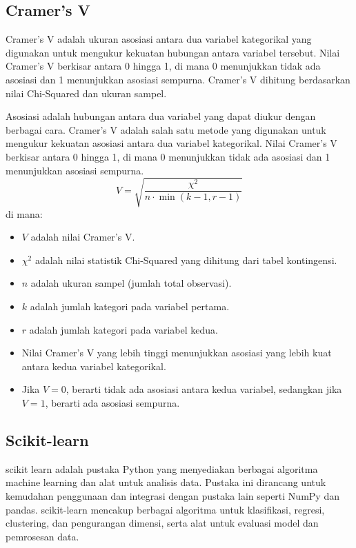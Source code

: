 \subsection{Cramer's V}
Cramer's V adalah ukuran asosiasi antara dua variabel kategorikal yang digunakan untuk mengukur kekuatan hubungan antara variabel tersebut. Nilai Cramer's V berkisar antara 0 hingga 1, di mana 0 menunjukkan tidak ada asosiasi dan 1 menunjukkan asosiasi sempurna. Cramer's V dihitung berdasarkan nilai Chi-Squared dan ukuran sampel.

Asosiasi adalah hubungan antara dua variabel yang dapat diukur dengan berbagai cara. Cramer's V adalah salah satu metode yang digunakan untuk mengukur kekuatan asosiasi antara dua variabel kategorikal. Nilai Cramer's V berkisar antara 0 hingga 1, di mana 0 menunjukkan tidak ada asosiasi dan 1 menunjukkan asosiasi sempurna.
\begin{equation}
    V = \sqrt{\frac{\chi^2}{n \cdot \min(k-1, r-1)}}
\end{equation}
di mana:
\begin{itemize}
    \item \( V \) adalah nilai Cramer's V.
    \item \( \chi^2 \) adalah nilai statistik Chi-Squared yang dihitung dari tabel kontingensi.
    \item \( n \) adalah ukuran sampel (jumlah total observasi).
    \item \( k \) adalah jumlah kategori pada variabel pertama.
    \item \( r \) adalah jumlah kategori pada variabel kedua.
    \item Nilai Cramer's V yang lebih tinggi menunjukkan asosiasi yang lebih kuat antara kedua variabel kategorikal.
    \item Jika \( V = 0 \), berarti tidak ada asosiasi antara kedua variabel, sedangkan jika \( V = 1 \), berarti ada asosiasi sempurna.
\end{itemize}

\subsection{Scikit-learn}
scikit learn adalah pustaka Python yang menyediakan berbagai algoritma machine learning dan alat untuk analisis data. Pustaka ini dirancang untuk kemudahan penggunaan dan integrasi dengan pustaka lain seperti NumPy dan pandas. scikit-learn mencakup berbagai algoritma untuk klasifikasi, regresi, clustering, dan pengurangan dimensi, serta alat untuk evaluasi model dan pemrosesan data.

